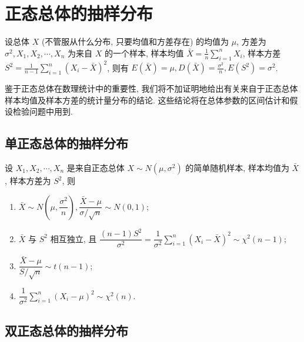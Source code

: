 \section{正态总体的抽样分布}

设总体 $ X $ (不管服从什么分布, 只要均值和方差存在) 的均值为 $ \mu $, 方差为 $ \sigma^{2}, X_{1}, X_{2}, \cdots ,  X_{n} $ 为来自 $ X $ 的一个样本, 样本均值 $\displaystyle \bar{X}=\frac{1}{n} \sum_{i=1}^{n} X_{i} $, 样本方差 $\displaystyle S^{2}=\frac{1}{n-1} \sum_{i=1}^{n}\left(X_{i}-\bar{X}\right)^{2} $, 则有 $\displaystyle E(\bar{X})=\mu, D(\bar{X})=\frac{\sigma^{2}}{n}, E\left(S^{2}\right)=\sigma^{2} $.

鉴于正态总体在数理统计中的重要性, 我们将不加证明地给出有关来自于正态总体样本均值及样本方差的统计量分布的结论. 这些结论将在总体参数的区间估计和假设检验问题中用到.

\subsection{单正态总体的抽样分布}

\begin{theorem}[单正态总体的抽样分布]
    设 $ X_{1}, X_{2}, \cdots, X_{n} $ 是来自正态总体 $ X \sim N\left(\mu, \sigma^{2}\right) $ 的简单随机样本, 样本均值为 $ \bar{X} $, 样本方差为 $ S^{2}$, 则
    \begin{enumerate}[label=(\arabic{*})]
        \item $\bar{X} \sim N\left(\mu, \dfrac{\sigma^{2}}{n}\right), \dfrac{\bar{X}-\mu}{\sigma / \sqrt{n}} \sim N(0,1) $;
        \item $\bar{X} $ 与 $ S^{2} $ 相互独立, 且
              $\displaystyle \dfrac{(n-1) S^{2}}{\sigma^{2}}=\dfrac{1}{\sigma^{2}} \sum_{i=1}^{n}\left(X_{i}-\bar{X}\right)^{2} \sim \chi^{2}(n-1)$;
        \item $\displaystyle \dfrac{\bar{X}-\mu}{S / \sqrt{n}} \sim t(n-1) $;
        \item $\displaystyle \dfrac{1}{\sigma^{2}} \sum_{i=1}^{n}\left(X_{i}-\mu\right)^{2} \sim \chi^{2}(n) .$
    \end{enumerate}
\end{theorem}

\subsection{双正态总体的抽样分布}

